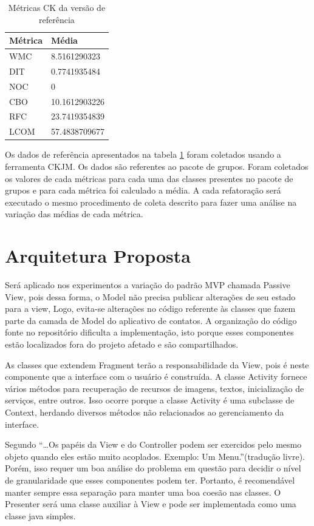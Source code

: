 \begin{table}[!h]
	\centering
	    \caption{Métricas CK da versão de referência}
	
    \begin{tabular}{ | l | l | }
    \hline
    Métrica &	Média \\ \hline
    WMC  	&	8.5161290323   	\\ \hline
    DIT	 	&	0.7741935484	\\ \hline
	NOC  	& 	0				\\ \hline
	CBO	  	& 	10.1612903226	\\ \hline
	RFC	 	& 	23.7419354839	\\ \hline
	LCOM 	& 	57.4838709677	\\ \hline
    \end{tabular}
    \label{tab:dados_baseline}
\end{table}


Os dados de referência apresentados na tabela \ref{tab:dados_baseline} foram
coletados usando a ferramenta CKJM. Os dados são referentes ao pacote de grupos.
Foram coletados os valores de cada métricas para cada uma das classes presentes
no pacote de grupos e para cada métrica foi calculado a média. A cada
refatoração será executado o mesmo procedimento de coleta descrito para fazer
uma análise na variação das médias de cada métrica.


\section{Arquitetura Proposta}

Será aplicado nos experimentos a variação do padrão MVP chamada Passive View,
pois dessa forma, o Model não precisa publicar alterações de seu estado para a
view, Logo, evita-se alterações no código referente às classes que fazem
parte da camada de Model do aplicativo de contatos. A organização do código
fonte no repositório dificulta a implementação, isto porque esses componentes estão
localizados fora do projeto afetado e são compartilhados.

As classes que extendem Fragment terão a responsabilidade da View, pois é neste
componente que a interface com o usuário é construída. A classe Activity fornece
vários métodos para recuperação de recursos de imagens, textos, inicialização de
serviços, entre outros. Isso ocorre porque a classe Activity é uma subclasse de Context, herdando diversos métodos não relacionados ao gerenciamento da interface.

Segundo  ``\ldots Os papéis da View e do
Controller podem ser exercidos pelo mesmo objeto quando eles estão muito
acoplados. Exemplo: Um Menu.''(tradução livre). Porém, isso requer um boa
análise do problema em questão para decidir o nível de granularidade que esses componentes podem ter.
Portanto, é recomendável manter sempre essa separação para manter uma boa coesão
nas classes. O Presenter será uma classe auxiliar à View e pode ser implementada
como uma classe java simples. 



